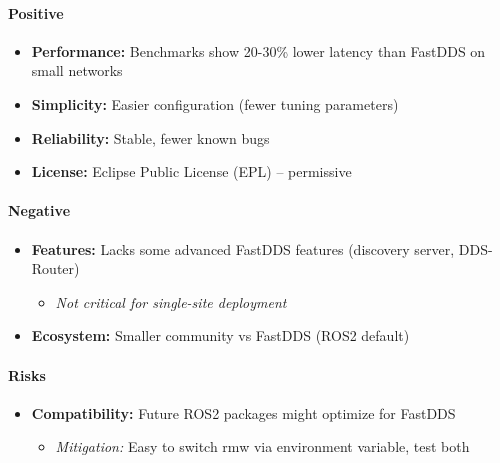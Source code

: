 \documentclass[
]{article}
\providecommand{\tightlist}{%
  \setlength{\itemsep}{0pt}\setlength{\parskip}{0pt}}
\begin{document}
\hypertarget{positive-1}{%
\paragraph{Positive}\label{positive-1}}

\begin{itemize}
\tightlist
\item
  \textbf{Performance:} Benchmarks show 20-30\% lower latency than
  FastDDS on small networks
\item
  \textbf{Simplicity:} Easier configuration (fewer tuning parameters)
\item
  \textbf{Reliability:} Stable, fewer known bugs
\item
  \textbf{License:} Eclipse Public License (EPL) -- permissive
\end{itemize}

\hypertarget{negative-1}{%
\paragraph{Negative}\label{negative-1}}

\begin{itemize}
\tightlist
\item
  \textbf{Features:} Lacks some advanced FastDDS features (discovery
  server, DDS-Router)

  \begin{itemize}
  \tightlist
  \item
    \emph{Not critical for single-site deployment}
  \end{itemize}
\item
  \textbf{Ecosystem:} Smaller community vs FastDDS (ROS2 default)
\end{itemize}

\hypertarget{risks-1}{%
\paragraph{Risks}\label{risks-1}}

\begin{itemize}
\tightlist
\item
  \textbf{Compatibility:} Future ROS2 packages might optimize for
  FastDDS

  \begin{itemize}
  \tightlist
  \item
    \emph{Mitigation:} Easy to switch rmw via environment variable, test
    both
  \end{itemize}
\end{itemize}
\end{document}
